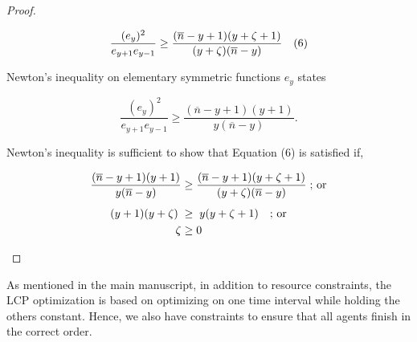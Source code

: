 \documentclass[letterpaper]{article} %
\theoremstyle{definition}
\begin{document}
\begin{proof}
\begin{linenomath}
\begin{equation*}
\displaystyle \frac{(e_{y})^{2}}{e_{y+1} e_{y-1}} \geq  \displaystyle \frac{(\overline{n} - y +1) (y + \zeta + 1)}{(y + \zeta)(\overline{n} - y)} \quad \textnormal{(6)}    
\end{equation*}
\end{linenomath}

\noindent Newton's inequality on elementary symmetric functions $e_{y}$ states
\begin{linenomath}
\begin{equation*}
\displaystyle \frac{(e_{y})^{2}}{e_{y+1} e_{y-1}} \geq  \displaystyle \frac{(\overline{n} - y +1) (y + 1)}{ y (\overline{n} - y)}.
\end{equation*}
\end{linenomath}

\noindent Newton's inequality is sufficient to show that Equation (6) is satisfied if,
\begin{linenomath}
\begin{equation*}
\begin{split}
\displaystyle \frac{(\overline{n} - y +1) (y + 1)}{ y (\overline{n} - y)} & \geq \displaystyle \frac{(\overline{n} - y +1) (y + \zeta + 1)}{(y + \zeta)(\overline{n} - y)} \; \textnormal{; or} \\[4 pt]
(y + 1) (y + \zeta) \; & \geq \; y (y + \zeta + 1) \quad \textnormal{; or}\\
\zeta & \geq 0\
\end{split}    
\end{equation*}
\end{linenomath}

\end{proof}

As mentioned in the main manuscript, in addition to resource constraints, the LCP optimization is based on optimizing on one time interval while holding the others constant. Hence, we also have constraints to ensure that all agents finish in the correct order. 
\end{document}
